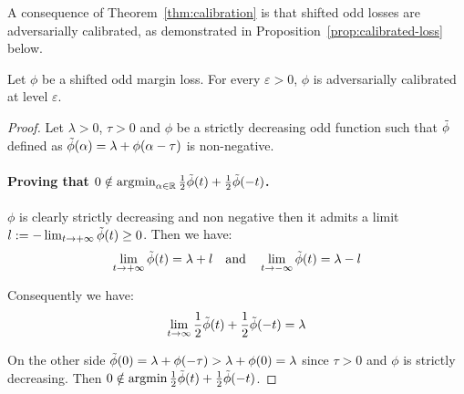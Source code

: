 A consequence of Theorem~\ref{thm:calibration} is that shifted odd losses are adversarially calibrated, as demonstrated in Proposition~\ref{prop:calibrated-loss} below.

\begin{prop}
\label{prop:calibrated-loss}
Let $\phi$ be a shifted odd margin loss. For every $\varepsilon>0$, ${\phi}$ is adversarially calibrated at level $\varepsilon$.
\end{prop}


\begin{proof}
    Let $\lambda>0$, $\tau>0$ and $\phi$ be a strictly decreasing odd function such that $\Tilde{\phi}$ defined as  $\Tilde{\phi}(\alpha) = \lambda +\phi(\alpha-\tau)$ is non-negative. 
    
    \paragraph{Proving that $0\notin\operatorname*{argmin}_{\alpha\in\mathbb{R}}\frac12\Tilde{\phi}(t)+\frac12 \Tilde{\phi}(-t)$.}${\phi}$ is clearly strictly decreasing and non negative then it admits a limit $l:=-\lim_{t\to+\infty}\Tilde{\phi}(t)\geq0$. Then we have:
    \begin{align*}
        \lim_{t\to+\infty}\Tilde{\phi}(t) = \lambda+l\quad\text{and}\quad\lim_{t\to-\infty}\Tilde{\phi}(t) = \lambda-l
    \end{align*}
    
    Consequently we have:
    \begin{align*}
        \lim_{t\to\infty}\frac12\Tilde{\phi}(t)+\frac12 \Tilde{\phi}(-t)= \lambda
    \end{align*}
    
    On the other side $\Tilde{\phi}(0)= \lambda + \phi(-\tau) >\lambda +\phi(0) =\lambda$ since $\tau>0$ and $\phi$ is strictly decreasing. Then $0\notin \operatorname*{argmin}\frac12\Tilde{\phi}(t)+\frac12 \Tilde{\phi}(-t)$.
    
    

\end{proof}
